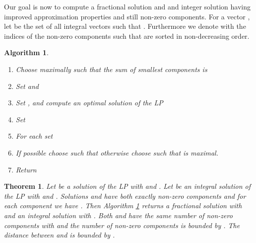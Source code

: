 \documentclass[a4paper,11pt]{article}
\newtheorem{thm}{Theorem}
\newtheorem{algo}{Algorithm}
\begin{document}
Our goal is now to compute a fractional solution  and and integer solution  having improved approximation properties
and still  non-zero components.
For a vector , let  be the set of all integral vectors 
 such that .
Furthermore we denote with  the indices of the non-zero components  such that
 are sorted in non-decreasing order.
\begin{algo}\label{alg4}
\ 
  \begin{enumerate}
  \item Choose  maximally such that the sum of smallest  components  is 
  
	\item Set  and 
	\item Set ,  and compute an 
	optimal solution  of the LP  
  \item Set 
  \item For each  set 
	\item If possible choose  such that  otherwise
  choose  such that  is maximal.
  \item Return 
  \end{enumerate}
\end{algo}
\begin{thm}
	Let  be a solution of the LP with  and 
	. Let  be an integral
	 solution of the LP with   and .
	 Solutions  and  have both exactly  non-zero components and for each component we have 
	 .
	Then Algorithm \ref{alg4} returns a fractional solution  with 
	 and an integral solution
	 with . Both  and  have the same 
	number of non-zero components with  and the number of non-zero components is bounded by
	 .
	The distance between  and  is bounded by .
\end{thm}
\end{document}
